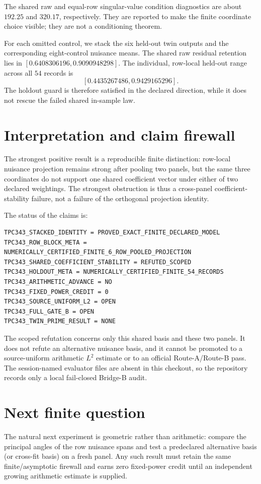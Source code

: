 \documentclass[11pt]{article}
\begin{document}
The shared raw and equal-row singular-value condition diagnostics are about
$192.25$ and $320.17$, respectively.  They are reported to make the finite
coordinate choice visible; they are not a conditioning theorem.

For each omitted control, we stack the six held-out twin outputs and the
corresponding eight-control nuisance means.  The shared raw residual retention
lies in $[0.6408306196,0.9090948298]$.  The individual, row-local held-out
range across all $54$ records is
\[
 [0.4435267486,0.9429165296].
\]
The holdout guard is therefore satisfied in the declared direction, while it
does not rescue the failed shared in-sample law.

\section{Interpretation and claim firewall}

The strongest positive result is a reproducible finite distinction: row-local
nuisance projection remains strong after pooling two panels, but the same
three coordinates do not support one shared coefficient vector under either
of two declared weightings.  The strongest obstruction is thus a
cross-panel coefficient-stability failure, not a failure of the orthogonal
projection identity.

The status of the claims is:
\begin{verbatim}
TPC343_STACKED_IDENTITY = PROVED_EXACT_FINITE_DECLARED_MODEL
TPC343_ROW_BLOCK_META = NUMERICALLY_CERTIFIED_FINITE_6_ROW_POOLED_PROJECTION
TPC343_SHARED_COEFFICIENT_STABILITY = REFUTED_SCOPED
TPC343_HOLDOUT_META = NUMERICALLY_CERTIFIED_FINITE_54_RECORDS
TPC343_ARITHMETIC_ADVANCE = NO
TPC343_FIXED_POWER_CREDIT = 0
TPC343_SOURCE_UNIFORM_L2 = OPEN
TPC343_FULL_GATE_B = OPEN
TPC343_TWIN_PRIME_RESULT = NONE
\end{verbatim}
The scoped refutation concerns only this shared basis and these two panels.  It
does not refute an alternative nuisance basis, and it cannot be promoted to a
source-uniform arithmetic $L^2$ estimate or to an official Route-A/Route-B
pass.  The session-named evaluator files are absent in this checkout, so the
repository records only a local fail-closed Bridge-B audit.

\section{Next finite question}

The natural next experiment is geometric rather than arithmetic: compare the
principal angles of the row nuisance spans and test a predeclared alternative
basis (or cross-fit basis) on a fresh panel.  Any such result must retain the
same finite/asymptotic firewall and earns zero fixed-power credit until an
independent growing arithmetic estimate is supplied.
\end{document}
